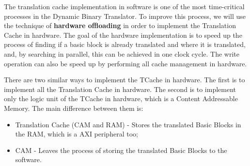 The translation cache implementation in software is one of the most time-critical processes in the Dynamic Binary Translator. To improve this process, we will use the technique of \textbf{hardware offloading} in order to implement the Translation Cache in hardware. 
The goal of the hardware implementation is to speed up the process of finding if a basic block is already translated and where it is translated, and, by searching in parallel, this can be achieved in one clock cycle. The write operation can also be speed up by performing all cache management in hardware.

There are two similar ways to implement the TCache in hardware. The first is to implement all the Translation Cache in hardware. The second is to implement only the logic unit of the TCache in hardware, which is a Content Addressable Memory. The main difference between them is:
\begin{itemize}
	\item Translation Cache (CAM and RAM) - Stores the translated Basic Blocks in the RAM, which is a AXI peripheral too;
	\item CAM - Leaves the process of storing the translated Basic Blocks to the software.
\end{itemize}
